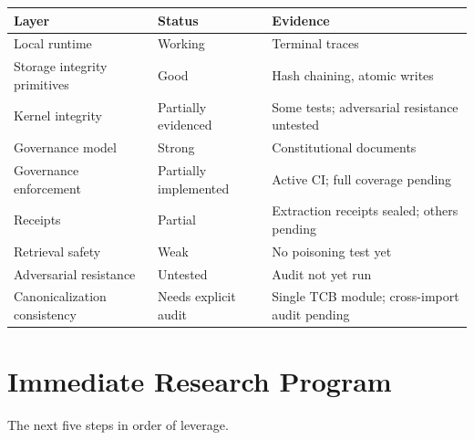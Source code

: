 \documentclass[11pt,a4paper]{article}
\theoremstyle{plain}
\theoremstyle{definition}
\theoremstyle{remark}
\begin{document}
\begin{center}
\begin{tabular}{lll}
\toprule
Layer & Status & Evidence \\
\midrule
Local runtime             & Working              & Terminal traces \\
Storage integrity primitives & Good              & Hash chaining, atomic writes \\
Kernel integrity          & Partially evidenced  & Some tests; adversarial resistance untested \\
Governance model          & Strong               & Constitutional documents \\
Governance enforcement    & Partially implemented & Active CI; full coverage pending \\
Receipts                  & Partial              & Extraction receipts sealed; others pending \\
Retrieval safety          & Weak                 & No poisoning test yet \\
Adversarial resistance    & Untested             & Audit not yet run \\
Canonicalization consistency & Needs explicit audit & Single TCB module; cross-import audit pending \\
\bottomrule
\end{tabular}
\end{center}

\section{Immediate Research Program}
\label{sec:research}

The next five steps in order of leverage.
\end{document}
